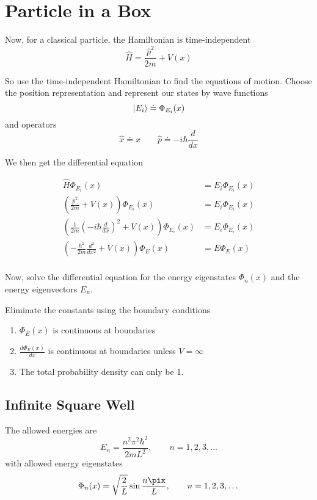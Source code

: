 \documentclass{article}
\begin{document}
\section{Particle in a Box}

Now, for a classical particle, the Hamiltonian is time-independent
$$
  \hat{H} = \frac{\hat{p}^2}{2m} + V(x)
$$

So use the time-independent Hamiltonian to find the equations of motion.  Choose the position representation and represent our states by wave functions
$$
  \ket{E_i} \doteq \Phi_{E_i}(x)
$$
and operators
$$
  \hat{x} \doteq x \qquad
  \hat{p} \doteq -i\hbar \frac{d}{dx}
$$

We then get the differential equation

\begin{align*}
  \hat{H} \Phi_{E_i}(x)                                                             & =  E_i \Phi_{E_i}(x) \\
  \left(\frac{\hat{p}^2}{2m} + V(x)\right)\Phi_{E_i}(x)                             & =  E_i \Phi_{E_i}(x) \\
  \left(\frac{1}{2m} \left( -i\hbar\frac{d}{dx}\right)^2 + V(x)\right)\Phi_{E_i}(x) & =  E_i \Phi_{E_i}(x) \\
  \left(-\frac{\hbar^2}{2m} \frac{d^2}{dx^2} + V(x)\right)\Phi_{E}(x)               & =  E \Phi_{E}(x)     \\
\end{align*}

Now, solve the differential equation for the energy eigenstates $\Phi_n(x)$ and the energy eigenvectors $E_n$.

Eliminate the constants using the boundary conditions
\begin{enumerate}
  \item $\Phi_E(x)$ is continuous at boundaries
  \item $\frac{d\Phi_E(x)}{dx}$ is continuous at boundaries unless $V = \infty$
  \item The total probability density can only be 1.
\end{enumerate}

\subsection{Infinite Square Well}
The allowed energies are
$$
  E_{n} = \frac{n^2 \pi^2 \hbar^2}{2mL^2}, \qquad n = 1,2,3, \dots
$$
with allowed energy eigenstates
$$
  \Phi_n(x) = \sqrt{\frac{2}{L}} \sin\frac{n\pix}{L}, \qquad n = 1,2,3, \dots
$$
\end{document}

